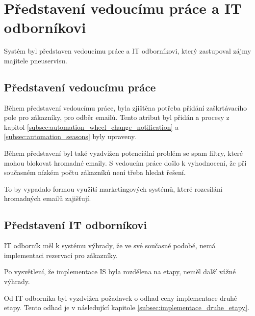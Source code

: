 \section{Představení vedoucímu práce a IT odborníkovi}
Systém byl představen vedoucímu práce a IT odborníkovi, který zastupoval zájmy majitele pneuservisu.
\subsection{Představení vedoucímu práce}
Během představení vedoucímu práce, byla zjištěna potřeba přidání zaškrtávacího pole pro zákazníky, pro odběr emailů. Tento atribut byl přidán a procesy z kapitol \ref{subsec:automation_wheel_change_notification} a \ref{subsec:automation_seasons} byly upraveny.

Během představení byl také vyzdvižen potenciální problém se spam filtry, které mohou blokovat hromadné emaily. S vedoucím práce došlo k vyhodnocení, že při současném nízkém počtu zákazníků není třeba hledat řešení.

To by vypadalo formou využití marketingových systémů, které rozesílání hromadných emailů zajišťují.
\subsection{Představení IT odborníkovi}
IT odborník měl k systému výhrady, že ve své současné podobě, nemá implementaci rezervací pro zákazníky. 

Po vysvětlení, že implementace IS byla rozdělena na etapy, neměl další vážné výhrady.

Od IT odborníka byl vyzdvižen požadavek o odhad ceny implementace druhé etapy. Tento odhad je v následující kapitole \ref{subsec:implementace_druhe_etapy}.
